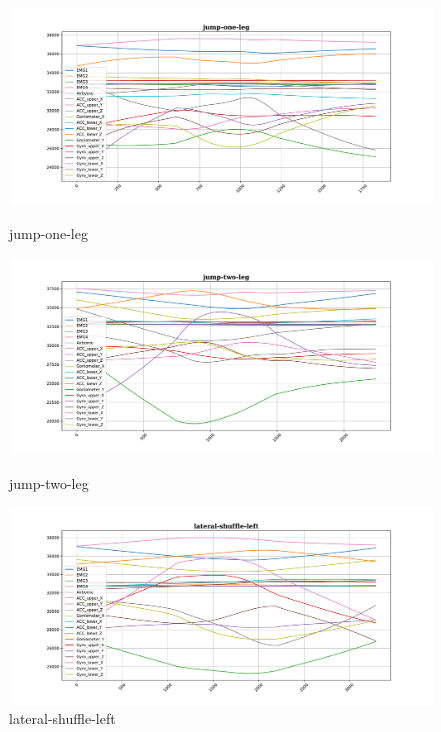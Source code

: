 \begin{figure}[!tbp]
	\begin{minipage}[b]{0.31\textwidth}
		\includegraphics[width=\textwidth]{images/jump-one-leg_example.pdf}
		\caption{jump-one-leg}
	\end{minipage}
	\begin{minipage}[b]{0.31\textwidth}
		\includegraphics[width=\textwidth]{images/jump-two-leg_example.pdf}
		\caption{jump-two-leg}
	\end{minipage}
	\begin{minipage}[b]{0.31\textwidth}
		\includegraphics[width=\textwidth]{images/lateral-shuffle-left_example.pdf}
		\caption{lateral-shuffle-left}
	\end{minipage}
\end{figure}


